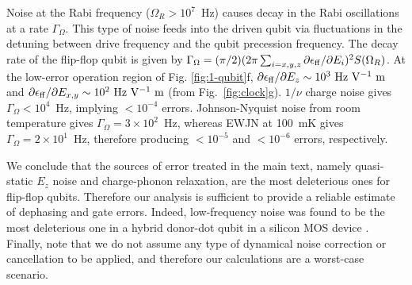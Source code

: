 \documentclass[aps,prb,superscriptaddress,nobibnotes,twocolumn]{revtex4-1}
\begin{document}
Noise at the Rabi frequency ($\Omega_R>10^{7}$~Hz) causes decay in the Rabi oscillations at a rate $\Gamma_\Omega$. This type of noise feeds into the driven qubit via fluctuations in the detuning between drive frequency and the qubit precession frequency. The decay rate of the flip-flop qubit is given by $\Gamma_\Omega=(\pi/2)(2\pi\sum_{i=x,y,z}\partial\epsilon_{\rm ff}/\partial E_i)^2S(\Omega_R)$. At the low-error operation region of Fig. \ref{fig:1-qubit}f, $\partial\epsilon_{\rm ff}/\partial E_z\sim10^3~{\rm Hz~V^{-1}~m}$ and $\partial\epsilon_{\rm ff}/\partial E_{x,y}\sim10^2~{\rm Hz~V^{-1}~m}$ (from Fig.~\ref{fig:clock}g). $1/\nu$ charge noise gives $\Gamma_\Omega<10^4$~Hz, implying $<10^{-4}$ errors. Johnson-Nyquist noise from room temperature gives $\Gamma_\Omega=3\times10^2$~Hz, whereas EWJN at 100~mK gives $\Gamma_\Omega=2\times10^1$~Hz, therefore producing $<10^{-5}$ and $<10^{-6}$ errors, respectively.

We conclude that the sources of error treated in the main text, namely quasi-static $E_z$ noise and charge-phonon relaxation, are the most deleterious ones for flip-flop qubits. Therefore our analysis is sufficient to provide a reliable estimate of dephasing and gate errors. Indeed, low-frequency noise was found to be the most deleterious one in a hybrid donor-dot qubit in a silicon MOS device \cite{Harvey-Collard2015S}. Finally, note that we do not assume any type of dynamical noise correction or cancellation to be applied, and therefore our calculations are a worst-case scenario.
\end{document}
